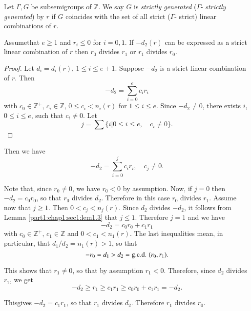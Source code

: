 \begin{defi}\label{part1:chap1:sec1:def1.7}
  Let $\Gamma, G$ be subsemigroups of $\mathbb{Z}$. We say $G$ is \textit{strictly generated} (\resp $\Gamma$- \textit{strictly generated}) by $r$ if $G$ coincides with the set of all strict (\resp $\Gamma$- strict) linear combinations of $r$.
\end{defi}

\begin{prop}\label{part1:chap1:sec1:prop1.8}
  Assume\pageoriginale that $e \geq 1$ and $r_i \leq 0$ for $i=0,1$. If $- d_2 (r)$ can be expressed as a strict linear combination of $r$ then $r_0$ divides $r_1$ or $r_1$ divides $r_0$.
\end{prop}

\begin{proof}
  Let $d_i = d_i (r)$, $1 \leq i \leq e+1$. Suppose $- d_2$ is a strict linear combination of $r$. Then
  $$
  - d_2 = \sum_{i=0}^e c_i r_i
  $$
  with $c_0 \in \mathbb{Z}^+$, $c_i \in \mathbb{Z}$, $0 \leq c_i < n_i (r)$ for $1 \leq i \leq e$. Since $- d_2 \neq 0$, there exists $i$, $0 \leq i \leq e$, such that $c_i \neq 0$. Let
$$
j = \sum\Big\{ i \Big| 0 \leq i \leq e, \quad c_i \neq 0\Big\}.
$$
\end{proof}

Then we have
$$
-d_2 = \sum_{i=0}^j c_i r_i, \quad c_j \neq 0.
$$

Note that, since $r_0 \neq 0$, we have $r_0 < 0$ by assumption. Now, if $j=0$ then $- d_2 = c_0 r_0$, so that $r_0$ divides $d_2$. Therefore in this case $r_0$ divides $r_1$. Assume now that $j \geq 1$. Then $0 < c_j < n_j (r)$. Since $d_2$ divides $- d_2$, it follows from Lemma \ref{part1:chap1:sec1:lem1.3} that $j \leq 1$. Therefore $j=1$ and we have
\begin{equation*}
  -d_2 = c_0 r_0 + c_1 r_1 \tag{1.8.1}\label{part1:chap1:sec1:eq1.8.1}
\end{equation*}
with $c_0 \in \mathbb{Z}^+$, $c_1 \in \mathbb{Z}$ and $0 < c_1 < n_1 (r)$. The last inequalities mean, in particular, that $d_1/d_2 = n_1 (r) > 1$, so that
$$
-r_0= d_1 > d_2 = \text{\gcd} (r_0 , r_1).
$$

This shows that $r_1 \neq 0$, so that by assumption $r_1 < 0$. Therefore, since $d_2$ divides $r_1$, we get
$$
-d_2 \geq r_1 \geq c_1 r_1 \geq c_0 r_0 + c_1 r_1 =- d_2.
$$

This\pageoriginale gives $-d_2 = c_1 r_1$, so that $r_1$ divides $d_2$. Therefore $r_1$ divides $r_0$.

